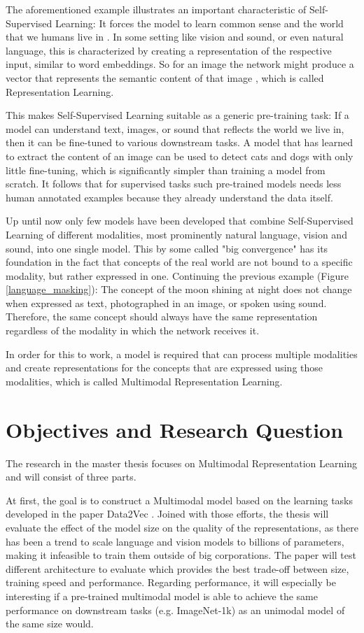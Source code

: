 The aforementioned example illustrates an important characteristic of Self-Supervised Learning:
It forces the model to learn common sense and the world that we humans live in \cite{lecun}.
In some setting like vision and sound, or even natural language, this is characterized by
creating a representation of the respective input, similar to word embeddings. So for an image
the network might produce a vector that represents the semantic content of that image \cite{wu}\cite{he}\cite{chen},
which is called Representation Learning.

This makes Self-Supervised Learning suitable as a generic pre-training task: If a model
can understand text, images, or sound that reflects the world we live in, then it
can be fine-tuned to various downstream tasks.
A model that has learned to extract the content of an image can be used
to detect cats and dogs with only little fine-tuning, which is significantly simpler than
training a model from scratch.
It follows that for supervised tasks such pre-trained models needs less human annotated examples because they
already understand the data itself.

Up until now only few models have been developed that combine Self-Supervised Learning
of different modalities, most prominently natural language, vision and sound, into one single model.
This by some called "big convergence" \cite{wang} has its foundation in the fact
that concepts of the real world are not bound to a specific modality, but rather
expressed in one.
Continuing the previous example (Figure \ref{language_masking}): The concept of the moon shining at night does not change
when expressed as text, photographed in an image, or spoken using sound.
Therefore, the same concept should always have the same representation regardless of the modality
in which the network receives it.

In order for this to work, a model is required that can process multiple modalities and create
representations for the concepts that are expressed using those modalities, which is called Multimodal
Representation Learning.

\section{Objectives and Research Question}

The research in the master thesis focuses on Multimodal Representation Learning and will consist of three parts.

At first, the goal is to construct a Multimodal model based on the learning tasks developed
in the paper Data2Vec \cite{baevski}. Joined with those efforts, the thesis will evaluate the effect
of the model size on the quality of the representations, as there has been a trend to 
scale language and vision models to billions of parameters, making it infeasible to train
them outside of big corporations.
The paper will test different architecture to evaluate which provides the best trade-off between size,
training speed and performance. Regarding performance, it will especially be interesting
if a pre-trained multimodal model is able to achieve the same performance on
downstream tasks (e.g. ImageNet-1k) as an unimodal model of the same size would.

